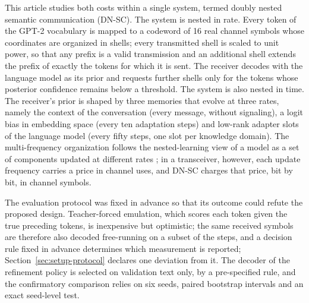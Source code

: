 This article studies both costs within a single system, termed doubly nested semantic communication (DN-SC). The system is nested in rate. Every token of the GPT-2 vocabulary \cite{radford2019} is mapped to a codeword of 16 real channel symbols whose coordinates are organized in shells; every transmitted shell is scaled to unit power, so that any prefix is a valid transmission and an additional shell extends the prefix of exactly the tokens for which it is sent. The receiver decodes with the language model as its prior and requests further shells only for the tokens whose posterior confidence remains below a threshold. The system is also nested in time. The receiver's prior is shaped by three memories that evolve at three rates, namely the context of the conversation (every message, without signaling), a logit bias in embedding space (every ten adaptation steps) and low-rank adapter slots of the language model \cite{hu2022lora} (every fifty steps, one slot per knowledge domain). The multi-frequency organization follows the nested-learning view of a model as a set of components updated at different rates \cite{behrouz2025}; in a transceiver, however, each update frequency carries a price in channel uses, and DN-SC charges that price, bit by bit, in channel symbols.

The evaluation protocol was fixed in advance so that its outcome could refute the proposed design. Teacher-forced emulation, which scores each token given the true preceding tokens, is inexpensive but optimistic; the same received symbols are therefore also decoded free-running on a subset of the steps, and a decision rule fixed in advance determines which measurement is reported; Section~\ref{sec:setup-protocol} declares one deviation from it. The decoder of the refinement policy is selected on validation text only, by a pre-specified rule, and the confirmatory comparison relies on six seeds, paired bootstrap intervals and an exact seed-level test.


